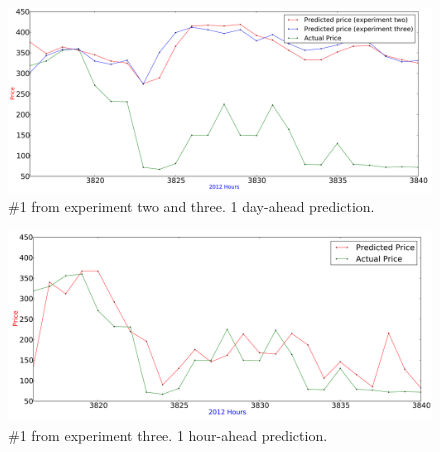 \begin{figure}[H]
\centering
\includegraphics[width=\linewidth]{billeder/PriceExperimentalAnalysis/X2_X3_3816_3840.png}
\caption{\#1 from experiment two and three. 1 day-ahead prediction.}
\label{fig:X2_X3_3816_3840}
\end{figure}

\begin{figure}[H]
\centering
\includegraphics[width=\linewidth]{billeder/PriceExperimentalAnalysis/X2_X3_3816_3840_1hourAhead.png}
\caption{\#1 from experiment three. 1 hour-ahead prediction.}
\label{fig:X2_X3_3816_3840_1hourahead}
\end{figure}

